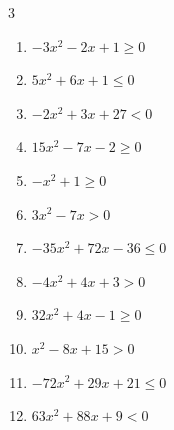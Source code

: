 \begin{multicols}{3}
\begin{enumerate}
  \item $-3x^{2}-2x+1\geq 0$


  \item $5x^{2}+6x+1\leq 0$


  \item $-2x^{2}+3x+27<0$


\columnbreak %

  \item $15x^{2}-7x-2\geq 0$


  \item $-x^{2}+1\geq 0$

        \phantom{$\displaystyle -1 \leqq x \leqq 1$}

  \item $3x^{2}-7x>0$


  \item $-35x^{2}+72x-36\leq 0$


  \item $-4x^{2}+4x+3>0$


  \item $32x^{2}+4x-1\geq 0$


  \item $x^{2}-8x+15>0$

        \phantom{$\displaystyle x < 3 , \; 5 < x$}

  \item $-72x^{2}+29x+21\leq 0$


  \item $63x^{2}+88x+9<0$



\end{enumerate}
\end{multicols}
